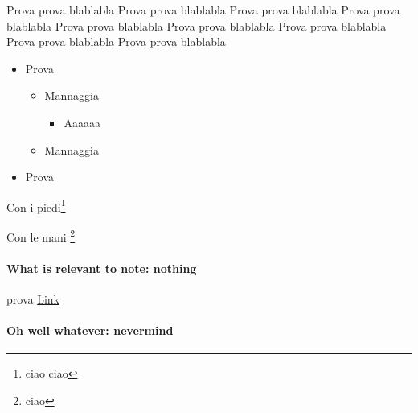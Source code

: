 \documentclass[
]{article}
\providecommand{\tightlist}{%
  \setlength{\itemsep}{0pt}\setlength{\parskip}{0pt}}
\begin{document}
Prova prova blablabla Prova prova blablabla Prova prova blablabla Prova
prova blablabla Prova prova blablabla Prova prova blablabla Prova prova
blablabla Prova prova blablabla Prova prova blablabla

\begin{itemize}
\tightlist
\item
  Prova

  \begin{itemize}
  \tightlist
  \item
    Mannaggia

    \begin{itemize}
    \tightlist
    \item
      Aaaaaa
    \end{itemize}
  \item
    Mannaggia
  \end{itemize}
\item
  Prova
\end{itemize}

Con i piedi\footnote{ciao ciao}

Con le mani \footnote{ciao}

\hypertarget{what-is-relevant-to-note-nothing}{%
\paragraph{What is relevant to note:
nothing}\label{what-is-relevant-to-note-nothing}}

prova \color{blue}\href{https://poterealpopolo.org/}{Link}\normalcolor

\hypertarget{oh-well-whatever-nevermind}{%
\paragraph{Oh well whatever:
nevermind}\label{oh-well-whatever-nevermind}}
\end{document}
